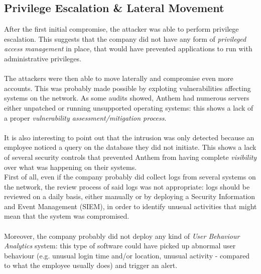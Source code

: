 	\subsection{Privilege Escalation \& Lateral Movement}
	After the first initial compromise, the attacker was able to perform privilege escalation. This suggests that the company did not have any form of \textit{privileged access management} in place, that would have prevented applications to run with administrative privileges.\\\\ %
	The attackers were then able to move laterally and compromise even more accounts. This was probably made possible by exploting vulnerabilities affecting systems on the network. As some audits\cite{anthemAuditReport} showed, Anthem had numerous servers either unpatched or running unsupported operating systems: this shows a lack of a proper \textit{vulnerability assessment/mitigation process}.\\\\ %
	It is also interesting to point out that the intrusion was only detected because an employee noticed a query on the database they did not initiate. This shows a lack of several security controls that prevented Anthem from having complete \textit{visibility} over what was happening on their systems.\\First of all, even if the company probably did collect logs from several systems on the network, the review process of said logs was not appropriate: logs should be reviewed on a daily basis, either manually or by deploying a Security Information and Event Management (SIEM), in order to identify unusual activities that might mean that the system was compromised.\\\\
	Moreover, the company probably did not deploy any kind of \textit{User Behaviour Analytics} system: this type of software could have picked up abnormal user behaviour (e.g. unusual login time and/or location, unusual activity - compared to what the employee usually does) and trigger an alert.

